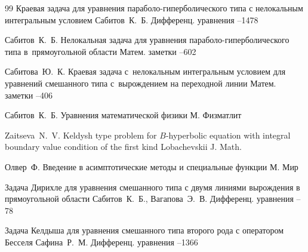 \begin{thebibliography}{99}
\paper Краевая задача для уравнения параболо-гиперболического типа с нелокальным интегральным условием
\by Сабитов~К.~Б.
\jour Дифференц. уравнения
--1478

\by Сабитов~К.~Б.
\paper Нелокальная задача для уравнения параболо-гиперболического типа в~прямоугольной области
\jour Матем. заметки
--602

\by Сабитова~Ю.~К.
\paper Краевая задача с~нелокальным интегральным условием для уравнений смешанного типа с~вырождением
на переходной линии
\jour Матем. заметки
--406

\by Сабитов~К.~Б.
\book Уравнения математической физики
\publaddr М.
\publ Физматлит

\by Zaitseva~N.~V.
\paper Keldysh type problem for $B$-hyperbolic equation with integral boundary value condition of the first kind
\jour Lobachevskii J. Math.
\toappear

\by Олвер~Ф.
\book Введение в асимптотические методы и специальные функции
\publaddr М.
\publ Мир

\paper Задача Дирихле для уравнения смешанного типа с двумя линиями вырождения в прямоугольной области
\by Сабитов~К.~Б., Вагапова~Э.~В.
\jour Дифференц. уравнения
--78

\paper Задача Келдыша для уравнения смешанного типа второго рода с оператором Бесселя
\by Сафина~Р.~М.
\jour Дифференц. уравнения
--1366

\end{thebibliography}

